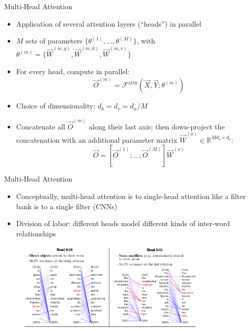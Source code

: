 \begin{vbframe}{Multi-Head Attention}

\vfill

\begin{itemize}
\item Application of several attention layers (``heads'') in parallel
\item $M$ sets of parameters $\{\theta^{(1)}, \ldots, \theta^{(M)}\}$, with $\theta^{(m)} = \{\vec {W}^{(m,q)}, \vec {W}^{(m,k)}, \vec {W}^{(m,v)}\}$
\item For every head, compute in parallel:
$$ \vec O^{(m)} = \mathcal{F}^\mathrm{attn}(\vec X, \vec Y; \theta^{(m)}) $$
\item Choice of dimensionality: $d_k = d_v = d_{x}/M$ 
\item Concatenate all $\vec {O}^{(m)}$ along their last axis; then down-project the concatenation with an additional parameter matrix $\vec W^{(o)} \in \mathbb{R}^{Md_v \times d_v}$:
$$ \vec O = [\vec O^{(1)}; \ldots;  \vec O^{(M)}] \vec W^{(o)}$$
\end{itemize}

\vfill

\end{vbframe}


\begin{vbframe}{Multi-Head Attention}

\vfill

\begin{itemize}
\item Conceptually, multi-head attention is to single-head attention like a filter bank is to a single filter (CNNs)
\item Division of labor: different heads model different kinds of inter-word relationships
\end{itemize}

	\begin{figure}
		\centering
		\includegraphics[width = 9cm]{figure/heads.png}\\ 
	\end{figure}

\vfill

\end{vbframe}

